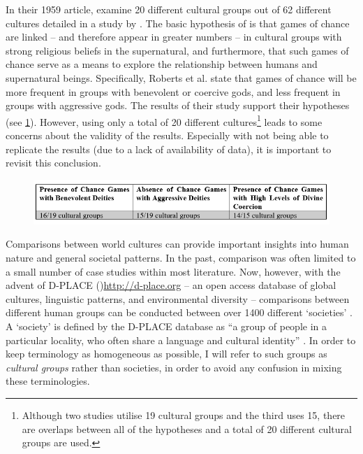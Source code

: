 \documentclass[%
	]{ijsra}
\begin{document}
In their 1959 article, \textcite{roberts1959} examine 20 different cultural groups out of 62 different cultures detailed in a study by \textcite{lambert1959}. The basic hypothesis of \textcite[601-602]{roberts1959} is that games of chance are linked – and therefore appear in greater numbers – in cultural groups with strong religious beliefs in the supernatural, and furthermore, that such games of chance serve as a means to explore the relationship between humans and supernatural beings. Specifically, Roberts et al. state that games of chance will be more frequent in groups with benevolent or coercive gods, and less frequent in groups with aggressive gods. The results of their study support their hypotheses (see \cref{fig:Davis-Table01}). However, using only a total of 20 different cultures\footnote{Although two studies utilise 19 cultural groups and the third uses 15, there are overlaps between all of the hypotheses and a total of 20 different cultural groups are used.} leads to some concerns about the validity of the results. Especially with \textcite{chick1998} not being able to replicate the results (due to a lack of availability of data), it is important to revisit this conclusion.
 
 	\begin{figure}[!htb] %
 		\includegraphics[width=\linewidth]{figures/Davis-Table01}
 		\centering
 		\label{fig:Davis-Table01}
 	\end{figure}
 
 
 Comparisons between world cultures can provide important insights into human nature and general societal patterns. In the past, comparison was often limited to a small number of case studies within most literature. Now, however, with the advent of D-PLACE ()\url{http://d-place.org} – an open access database of global cultures, linguistic patterns, and environmental diversity – comparisons between different human groups can be conducted between over 1400 different ‘societies’ \parencite{kirby2016}. A ‘society’ is defined by the D-PLACE database as ``a group of people in a particular locality, who often share a language and cultural identity” \parencite{D-PLACE}. In order to keep terminology as homogeneous as possible, I will refer to such groups as \textit{cultural groups} rather than societies, in order to avoid any confusion in mixing these terminologies.
 
\end{document}
